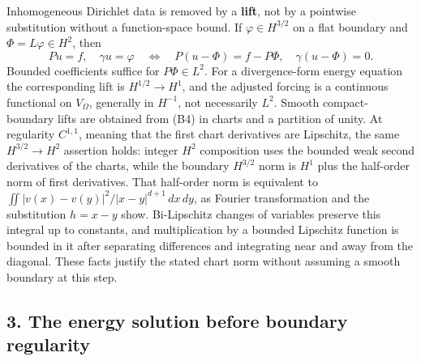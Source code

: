 \documentclass[
  11pt,
]{article}
\makeatletter
\let\ReaderOriginalAnchorStart\hyper@anchorstart
\let\ReaderOriginalAnchorEnd\hyper@anchorend
\let\ReaderPendingAliases\@empty
\def\ReaderArmAliases#1{\gdef\ReaderPendingAliases{#1}}
\def\hyper@anchorstart#1{\ReaderIfNativeAnchorTF{#1}{\ReaderPendingAliases\global\let\ReaderPendingAliases\@empty}{}\ReaderOriginalAnchorStart{#1}}
\makeatother
\begin{document}
Inhomogeneous Dirichlet data is removed by a \textbf{lift}, not by a
pointwise substitution without a function-space bound. If
\(\varphi\in H^{3/2}\) on a flat boundary and \(\Phi=L\varphi\in H^2\),
then \[
 Pu=f,\quad\gamma u=\varphi
 \quad\Longleftrightarrow\quad
 P(u-\Phi)=f-P\Phi,\quad\gamma(u-\Phi)=0. \tag{B7}
\] Bounded coefficients suffice for \(P\Phi\in L^2\). For a
divergence-form energy equation the corresponding lift is
\(H^{1/2}\to H^1\), and the adjusted forcing is a continuous functional
on \(V_\Omega\), generally in \(H^{-1}\), not necessarily \(L^2\).
Smooth compact-boundary lifts are obtained from (B4) in charts and a
partition of unity. At regularity \(C^{1,1}\), meaning that the first
chart derivatives are Lipschitz, the same \(H^{3/2}\to H^2\) assertion
holds: integer \(H^2\) composition uses the bounded weak second
derivatives of the charts, while the boundary \(H^{3/2}\) norm is
\(H^1\) plus the half-order norm of first derivatives. That half-order
norm is equivalent to \(\iint |v(x)-v(y)|^2/|x-y|^{d+1}\,dx\,dy\), as
Fourier transformation and the substitution \(h=x-y\) show. Bi-Lipschitz
changes of variables preserve this integral up to constants, and
multiplication by a bounded Lipschitz function is bounded in it after
separating differences and integrating near and away from the diagonal.
These facts justify the stated chart norm without assuming a smooth
boundary at this step.

\ReaderArmAliases{\ReaderOriginalAnchorStart{AN03-SBD-003}\ReaderOriginalAnchorEnd\begingroup\expandafter\def\csname @currentHref\endcsname{AN03-SBD-003}\label{AN03-SBD-003}\endgroup\ReaderOriginalAnchorStart{an03-sbd-003-the-energy-solution-before-boundary-regularity}\ReaderOriginalAnchorEnd\begingroup\expandafter\def\csname @currentHref\endcsname{an03-sbd-003-the-energy-solution-before-boundary-regularity}\label{an03-sbd-003-the-energy-solution-before-boundary-regularity}\endgroup\ReaderOriginalAnchorStart{3-the-energy-solution-before-boundary-regularity}\ReaderOriginalAnchorEnd\begingroup\expandafter\def\csname @currentHref\endcsname{3-the-energy-solution-before-boundary-regularity}\label{3-the-energy-solution-before-boundary-regularity}\endgroup\ReaderOriginalAnchorStart{the-energy-solution-before-boundary-regularity}\ReaderOriginalAnchorEnd}
\subsection{3. The energy solution before boundary
regularity}\label{the-energy-solution-before-boundary-regularity}
\end{document}
